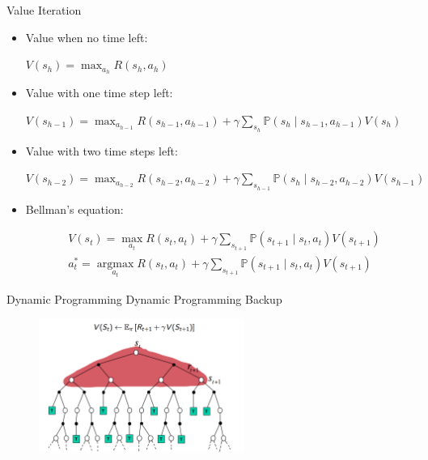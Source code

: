 \documentclass[11pt,table]{beamer}
\begin{document}
\begin{frame}{Value	Iteration \citep{bellman1957dynamic}}

\begin{footnotesize}
\begin{itemize}
    \item Value when \textcolor{red1}{no} time left:

$
V\left(s_{h}\right)=\max _{a_{h}} R\left(s_{h}, a_{h}\right)
$
\pause

\item Value with \textcolor{red1}{one time step} left:

$
V\left(s_{h-1}\right)=\max _{a_{h-1}} R\left(s_{h-1}, a_{h-1}\right)+\gamma \sum_{s_{h}} \mathbb{P}\left(s_{h} \mid s_{h-1}, a_{h-1}\right) V\left(s_{h}\right)
$
\pause

\item Value with \textcolor{red1}{two time steps} left:
\begin{scriptsize}

$
V\left(s_{h-2}\right)=\max _{a_{h-2}} R\left(s_{h-2}, a_{h-2}\right)+\gamma \sum_{s_{h-1}} \mathbb{P}\left(s_{h} \mid s_{h-2}, a_{h-2}\right) V\left(s_{h-1}\right)
$
\end{scriptsize}
\pause
\item Bellman's equation:

\begin{tcolorbox}[colframe=black, boxrule=1pt, sharp corners, ]
$$\begin{aligned}
& V\left(s_{t}\right)=\max _{a_{t}} R\left(s_{t}, a_{t}\right)+\gamma \sum_{s_{t+1}} \mathbb{P}\left(s_{t+1} \mid s_{t}, a_{t}\right) V\left(s_{t+1}\right) \\
& a_{t}^{*}=\underset{a_{t}}{\operatorname{argmax}} R\left(s_{t}, a_{t}\right)+\gamma \sum_{s_{t+1}} \mathbb{P}\left(s_{t+1} \mid s_{t}, a_{t}\right) V\left(s_{t+1}\right)
\end{aligned}
$$ 
    \end{tcolorbox}
\end{itemize}
    \end{footnotesize}
\end{frame}


\begin{frame}{Dynamic Programming}
Dynamic Programming Backup
\begin{figure}
	\centering
		\includegraphics[width=0.60\textwidth]{figures/dynamic_programming_backup.png}
	\label{fig:DP}
\end{figure}


\end{frame}
\end{document}
